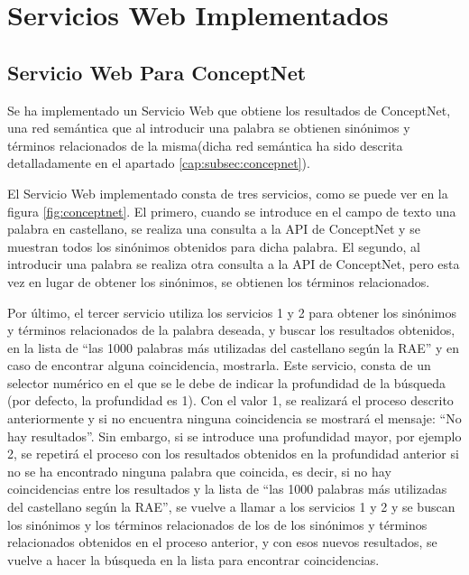 \chapter{Servicios Web Implementados}
\label{cap:serviciosWebImplementados}


\section{Servicio Web Para ConceptNet}
\label{cap:sec:servicioConceptnet}

Se ha implementado un Servicio Web que obtiene los resultados de ConceptNet, una red semántica que al introducir una palabra se obtienen sinónimos y términos relacionados de la misma(dicha red semántica ha sido descrita detalladamente en el apartado \ref{cap:subsec:concepnet}).


El Servicio Web implementado consta de tres servicios, como se puede ver en la figura \ref{fig:conceptnet}. El primero, cuando se introduce en el campo de texto una palabra en castellano, se realiza una consulta a la API de ConceptNet y se muestran todos los sinónimos obtenidos para dicha palabra. El segundo, al introducir una palabra se realiza otra consulta a la API de ConceptNet, pero esta vez en lugar de obtener los sinónimos, se obtienen los términos relacionados.

Por último, el tercer servicio utiliza los servicios 1 y 2 para obtener los sinónimos y términos relacionados de la palabra deseada, y buscar los resultados obtenidos, en la lista de ``las 1000 palabras más utilizadas del castellano según la RAE'' y en caso de encontrar alguna coincidencia, mostrarla. Este servicio, consta de un selector numérico en el que se le debe de indicar la profundidad de la búsqueda (por defecto, la profundidad es 1). Con el valor 1, se realizará el proceso descrito anteriormente y si no encuentra ninguna coincidencia se mostrará el mensaje: ``No hay resultados''. Sin embargo, si se introduce una profundidad mayor, por ejemplo 2, se repetirá el proceso con los resultados obtenidos en la profundidad anterior si no se ha encontrado ninguna palabra que coincida, es decir, si no hay coincidencias entre los resultados y la lista de ``las 1000 palabras más utilizadas del castellano según la RAE'', se vuelve a llamar a los servicios 1 y 2 y se buscan los sinónimos y los términos relacionados de los de los sinónimos y términos relacionados obtenidos en el proceso anterior, y con esos nuevos resultados, se vuelve a hacer la búsqueda en la lista para encontrar coincidencias.

